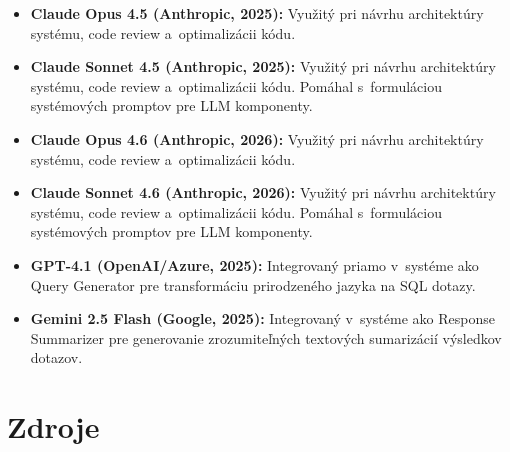 \documentclass[a4paper, 12pt]{article}
\begin{document}
\begin{itemize}
    \item \textbf{Claude Opus 4.5 (Anthropic, 2025):} Využitý pri návrhu architektúry systému, code review a~optimalizácii kódu.
\end{itemize}
\begin{itemize}
    \item \textbf{Claude Sonnet 4.5 (Anthropic, 2025):} Využitý pri návrhu architektúry systému, code review a~optimalizácii kódu. Pomáhal s~formuláciou systémových promptov pre LLM komponenty.
\end{itemize}
\begin{itemize}
    \item \textbf{Claude Opus 4.6 (Anthropic, 2026):} Využitý pri návrhu architektúry systému, code review a~optimalizácii kódu.
\end{itemize}
\begin{itemize}
    \item \textbf{Claude Sonnet 4.6 (Anthropic, 2026):} Využitý pri návrhu architektúry systému, code review a~optimalizácii kódu. Pomáhal s~formuláciou systémových promptov pre LLM komponenty.
\end{itemize}
\begin{itemize}
    \item \textbf{GPT-4.1 (OpenAI/Azure, 2025):} Integrovaný priamo v~systéme ako Query Generator pre transformáciu prirodzeného jazyka na SQL dotazy.
\end{itemize}

\begin{itemize}
    \item \textbf{Gemini 2.5 Flash (Google, 2025):} Integrovaný v~systéme ako Response Summarizer pre generovanie zrozumiteľných textových sumarizácií výsledkov dotazov.
\end{itemize}


\clearpage

\section*{Zdroje}
\end{document}
